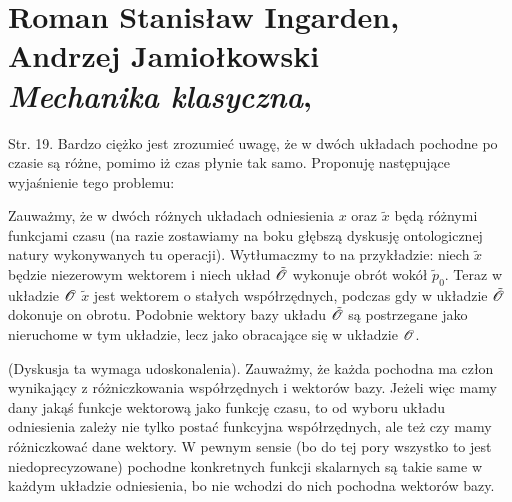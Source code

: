 \documentclass[a4paper,11pt]{article}
\numberwithin{equation}{section}
\begin{document}










\newpage

\section{ %
  Roman Stanisław Ingarden, Andrzej Jamiołkowski \\
  \textit{Mechanika klasyczna},
  \cite{IngardenJamiolkowskiMechanikaKlasyczna1980}}

\vspace{0em}



\vspace{0em}



\VerSpaceFour



\noindent
Str. 19. Bardzo ciężko jest zrozumieć uwagę, że w dwóch układach pochodne po czasie są różne, pomimo iż czas płynie tak samo. Proponuję następujące wyjaśnienie tego problemu:

Zauważmy, że w dwóch różnych układach odniesienia $x$ oraz
$\tilde{ x }$ będą różnymi funkcjami czasu (na razie zostawiamy na
boku głębszą dyskusję ontologicznej natury wykonywanych tu operacji).
Wytłumaczmy to na przykładzie: niech $\tilde{ x }$ będzie niezerowym
wektorem i niech układ $\tilde{ \mathcal{O} }$ wykonuje obrót wokół
$\tilde{ p }_{ 0 }$. Teraz w układzie $\mathcal{O}$ $\tilde{ x }$
jest wektorem o stałych współrzędnych, podczas gdy w układzie
$\tilde{ \mathcal{O} }$ dokonuje on obrotu. Podobnie wektory bazy
układu $\tilde{ \mathcal{O} }$ są postrzegane jako nieruchome w tym
układzie, lecz jako obracające się w
układzie $\mathcal{O}$.

(Dyskusja ta wymaga udoskonalenia). Zauważmy, że każda pochodna ma
człon wynikający z różniczkowania współrzędnych i wektorów bazy.
Jeżeli więc mamy dany jakąś funkcje wektorową jako funkcję czasu, to
od wyboru układu odniesienia zależy nie tylko postać funkcyjna
współrzędnych, ale też czy mamy różniczkować dane wektory. W pewnym
sensie (bo do tej pory wszystko to jest niedoprecyzowane) pochodne
konkretnych funkcji skalarnych są takie same w każdym układzie
odniesienia, bo nie wchodzi do nich pochodna wektorów bazy.
\end{document}
